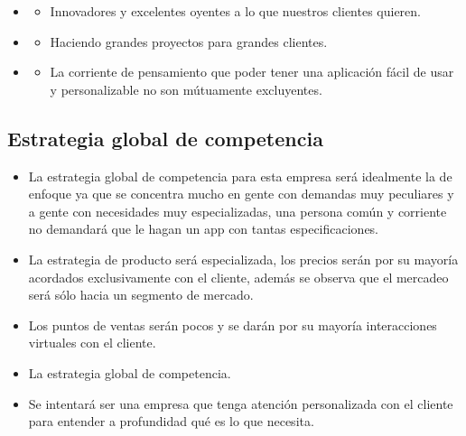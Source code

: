 \documentclass{article}
\begin{document}
\begin{itemize}
\begin{itemize}
            \item {} 
                \begin{itemize}
                    \item Innovadores y excelentes oyentes a lo que nuestros clientes quieren.
                \end{itemize}
                
            \item {} 
                \begin{itemize}
                    \item Haciendo grandes proyectos para grandes clientes.
                \end{itemize}
                
            \item {} 
                \begin{itemize}
                    \item La corriente de pensamiento que poder tener una aplicación fácil de usar y personalizable no son mútuamente excluyentes.
                \end{itemize}
        \end{itemize}
\end{itemize}


\subsection{Estrategia global de competencia}
\begin{itemize}
    \item La estrategia global de competencia para esta empresa será idealmente la de enfoque ya que se concentra mucho en gente con demandas muy peculiares y a gente con necesidades muy especializadas, una persona común y corriente no demandará que le hagan un app con tantas especificaciones.
    \item La estrategia de producto será especializada, los precios serán por su mayoría acordados exclusivamente con el cliente, además se observa que el mercadeo será sólo hacia un segmento de mercado. 
    \item Los puntos de ventas serán pocos y se darán por su mayoría interacciones virtuales con el cliente.
    \item La estrategia global de competencia.
    \item Se intentará ser una empresa que tenga atención personalizada con el cliente para entender a profundidad qué es lo que necesita.
\end{itemize}
\end{document}
